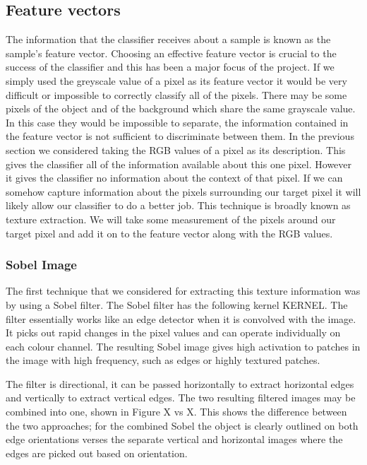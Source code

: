 \documentclass[12pt]{IIBproject}
\begin{document}
\subsection{Feature vectors}
The information that the classifier receives about a sample is known as the sample's feature vector.  Choosing an effective feature vector is crucial to the success of the classifier and this has been a major focus of the project. If we simply used the greyscale value of a pixel as its feature vector it would be very difficult or impossible to correctly classify all of the pixels. There may be some pixels of the object and of the background which share the same grayscale value. In this case they would be impossible to separate, the information contained in the feature vector is not sufficient to discriminate between them. In the previous section we considered taking the RGB values of a pixel as its description. This gives the classifier all of the information available about this one pixel. However it gives the classifier no information about the context of that pixel. If we can somehow capture information about the pixels surrounding our target pixel it will likely allow our classifier to do a better job. This technique is broadly known as texture extraction. We will take some measurement of the pixels around our target pixel and add it on to the feature vector along with the RGB values.

\subsubsection{Sobel Image}

 The first technique that we considered for extracting this texture information was by using a Sobel filter\cite{chaple2014design}. The Sobel filter has the following kernel KERNEL. The filter essentially works like an edge detector when it is convolved with the image. It picks out rapid changes in the pixel values and can operate individually on each colour channel. The resulting Sobel image gives high activation to patches in the image with high frequency, such as edges or highly textured patches.
 
 The filter is directional, it can be passed horizontally to extract horizontal edges and vertically to extract vertical edges. The two resulting filtered images may be combined into one, shown in Figure X vs X. This shows the difference between the two approaches;  for the combined Sobel the object is clearly outlined on both edge orientations verses the separate vertical and horizontal images where the edges are picked out based on orientation. 
\end{document}
